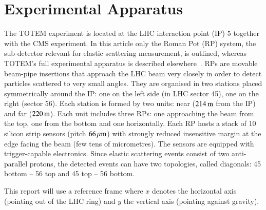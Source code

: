 \section{Experimental Apparatus}

The TOTEM experiment is located at the LHC interaction point (IP) 5 together 
with the CMS experiment. In this article only the Roman Pot (RP) system, the 
sub-detector relevant for elastic scattering measurement, is outlined, 
whereas TOTEM's full experimental apparatus is described %
elsewhere~\cite{totem-jinst}. 
RPs are movable beam-pipe
insertions that approach the LHC beam very closely in order to detect particles scattered to very small angles. They are organised in two stations placed symmetrically around the IP: one on the left side (in LHC sector 45), one on the right (sector 56). Each station is formed by two units: near ($214\,{\rm m}$ from the IP) and far ($220\,{\rm m}$). Each unit includes three RPs: one approaching the beam from the top, one from the bottom and one horizontally. Each RP hosts a stack of 10 silicon strip sensors (pitch $66\,{\rm \mu m}$) with strongly reduced insensitive margin at the edge facing the beam (few tens of micrometres). The sensors are equipped with trigger-capable electronics. Since elastic scattering events consist of two anti-parallel protons, the detected events can have two topologies, called diagonals: 45 bottom -- 56 top and 45 top -- 56 bottom.

This report will use a reference frame where $x$ denotes the horizontal axis (pointing out of the LHC ring) and $y$ the vertical axis (pointing against gravity).
